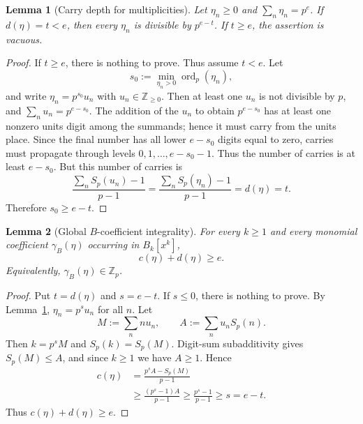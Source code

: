 \documentclass[11pt]{amsart}
\numberwithin{equation}{section}
\newtheorem{lemma}[lemma]{Lemma}
\DeclareMathOperator{\ordop}{ord}
\newcommand{\Zp}{\mathbb{Z}_p}
\newcommand{\Sp}{S_p}
\newcommand{\vp}{\ordop_p}
\begin{document}
\begin{lemma}[Carry depth for multiplicities]\label{lem:carry-depth}
Let $\eta_n\ge0$ and $\sum_n\eta_n=p^e$.  If $d(\eta)=t<e$, then every $\eta_n$ is divisible by $p^{e-t}$.  If $t\ge e$, the assertion is vacuous.
\end{lemma}
\begin{proof}
If $t\ge e$, there is nothing to prove.  Thus assume $t<e$.
Let
\[
        s_0:=\min_{\eta_n>0}\vp(\eta_n),
\]
and write $\eta_n=p^{s_0}u_n$ with $u_n\in\mathbb{Z}_{\ge0}$.  Then at least one $u_n$ is not divisible by $p$, and $\sum_nu_n=p^{e-s_0}$.  The addition of the $u_n$ to obtain $p^{e-s_0}$ has at least one nonzero units digit among the summands; hence it must carry from the units place.  Since the final number has all lower $e-s_0$ digits equal to zero, carries must propagate through levels $0,1,\ldots,e-s_0-1$.  Thus the number of carries is at least $e-s_0$.  But this number of carries is
\[
        \frac{\sum_n\Sp(u_n)-1}{p-1}
        =\frac{\sum_n\Sp(\eta_n)-1}{p-1}=d(\eta)=t.
\]
Therefore $s_0\ge e-t$.
\end{proof}

\begin{lemma}[Global $B$-coefficient integrality]\label{lem:B-integrality}
For every $k\ge1$ and every monomial coefficient $\gamma_B(\eta)$ occurring in $B_k[x^k]$,
\[
        c(\eta)+d(\eta)\ge e.
\]
Equivalently, $\gamma_B(\eta)\in\Zp$.
\end{lemma}
\begin{proof}
Put $t=d(\eta)$ and $s=e-t$.  If $s\le0$, there is nothing to prove.  By Lemma~\ref{lem:carry-depth}, $\eta_n=p^s u_n$ for all $n$.  Let
\[
        M:=\sum_nnu_n,
        \qquad
        A:=\sum_nu_n\Sp(n).
\]
Then $k=p^sM$ and $\Sp(k)=\Sp(M)$.  Digit-sum subadditivity gives $\Sp(M)\le A$, and since $k\ge1$ we have $A\ge1$.  Hence
\[
\begin{aligned}
        c(\eta)
        &=\frac{p^sA-\Sp(M)}{p-1}                         \\
        &\ge \frac{(p^s-1)A}{p-1}
        \ge \frac{p^s-1}{p-1}
        \ge s=e-t.
\end{aligned}
\]
Thus $c(\eta)+d(\eta)\ge e$.
\end{proof}
\end{document}
